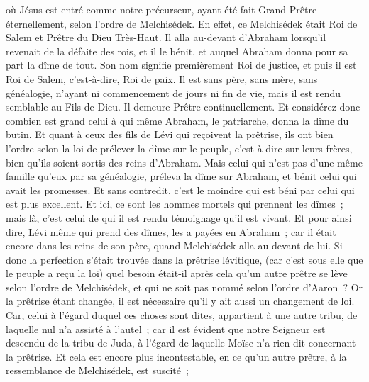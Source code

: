 \begin{multicols}{2}
où Jésus est entré comme notre précurseur, ayant été fait Grand-Prêtre éternellement, selon l'ordre de Melchisédek.
\VerseOne{}En effet, ce Melchisédek était Roi de Salem et Prêtre du Dieu Très-Haut. Il alla au-devant d'Abraham lorsqu'il revenait de la défaite des rois, et il le bénit,
et auquel Abraham donna pour sa part la dîme de tout. Son nom signifie premièrement Roi de justice, et puis il est Roi de Salem, c'est-à-dire, Roi de paix.
Il est sans père, sans mère, sans généalogie, n'ayant ni commencement de jours ni fin de vie, mais il est rendu semblable au Fils de Dieu. Il demeure Prêtre continuellement.
Et considérez donc combien est grand celui à qui même Abraham, le patriarche, donna la dîme du butin.
Et quant à ceux des fils de Lévi qui reçoivent la prêtrise, ils ont bien l’ordre selon la loi de prélever la dîme sur le peuple, c'est-à-dire sur leurs frères, bien qu'ils soient sortis des reins d'Abraham.
Mais celui qui n'est pas d'une même famille qu'eux par sa généalogie, préleva la dîme sur Abraham, et bénit celui qui avait les promesses.
Et sans contredit, c'est le moindre qui est béni par celui qui est plus excellent.
Et ici, ce sont les hommes mortels qui prennent les dîmes~; mais là, c'est celui de qui il est rendu témoignage qu'il est vivant.
Et pour ainsi dire, Lévi même qui prend des dîmes, les a payées en Abraham~;
car il était encore dans les reins de son père, quand Melchisédek alla au-devant de lui.
Si donc la perfection s'était trouvée dans la prêtrise lévitique, (car c'est sous elle que le peuple a reçu la loi) quel besoin était-il après cela qu'un autre prêtre se lève selon l'ordre de Melchisédek, et qui ne soit pas nommé selon l'ordre d'Aaron~?
Or la prêtrise étant changée, il est nécessaire qu'il y ait aussi un changement de loi.
Car, celui à l'égard duquel ces choses sont dites, appartient à une autre tribu, de laquelle nul n'a assisté à l'autel~;
car il est évident que notre Seigneur est descendu de la tribu de Juda, à l'égard de laquelle Moïse n'a rien dit concernant la prêtrise.
Et cela est encore plus incontestable, en ce qu'un autre prêtre, à la ressemblance de Melchisédek, est suscité~;

\end{multicols}
